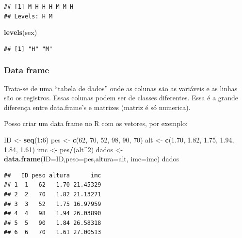 \documentclass[
]{book}
\newenvironment{Shaded}{\begin{snugshade}}{\end{snugshade}}
\newcommand{\DataTypeTok}[1]{\textcolor[rgb]{0.13,0.29,0.53}{#1}}
\newcommand{\DecValTok}[1]{\textcolor[rgb]{0.00,0.00,0.81}{#1}}
\newcommand{\FloatTok}[1]{\textcolor[rgb]{0.00,0.00,0.81}{#1}}
\newcommand{\KeywordTok}[1]{\textcolor[rgb]{0.13,0.29,0.53}{\textbf{#1}}}
\newcommand{\NormalTok}[1]{#1}
\newcommand{\OperatorTok}[1]{\textcolor[rgb]{0.81,0.36,0.00}{\textbf{#1}}}
\newcommand{\StringTok}[1]{\textcolor[rgb]{0.31,0.60,0.02}{#1}}
\begin{document}
\begin{verbatim}
## [1] M H H H M M H
## Levels: H M
\end{verbatim}

\begin{Shaded}
\begin{Highlighting}[]
\KeywordTok{levels}\NormalTok{(sex)}
\end{Highlighting}
\end{Shaded}

\begin{verbatim}
## [1] "H" "M"
\end{verbatim}

\hypertarget{data-frame}{%
\subsubsection{Data frame}\label{data-frame}}

Trata-se de uma ``tabela de dados'' onde as colunas são as variáveis e as linhas são os registros. Essas colunas podem ser de classes diferentes.
Essa é a grande diferença entre data.frame's e matrizes (matriz é só numerica).

Posso criar um data frame no R com os vetores, por exemplo:

\begin{Shaded}
\begin{Highlighting}[]
\NormalTok{ID <-}\StringTok{ }\KeywordTok{seq}\NormalTok{(}\DecValTok{1}\OperatorTok{:}\DecValTok{6}\NormalTok{)}
\NormalTok{pes <-}\StringTok{ }\KeywordTok{c}\NormalTok{(}\DecValTok{62}\NormalTok{, }\DecValTok{70}\NormalTok{, }\DecValTok{52}\NormalTok{, }\DecValTok{98}\NormalTok{, }\DecValTok{90}\NormalTok{, }\DecValTok{70}\NormalTok{)}
\NormalTok{alt <-}\StringTok{ }\KeywordTok{c}\NormalTok{(}\FloatTok{1.70}\NormalTok{, }\FloatTok{1.82}\NormalTok{, }\FloatTok{1.75}\NormalTok{, }\FloatTok{1.94}\NormalTok{, }\FloatTok{1.84}\NormalTok{, }\FloatTok{1.61}\NormalTok{)}
\NormalTok{imc <-}\StringTok{ }\NormalTok{pes}\OperatorTok{/}\NormalTok{(alt}\OperatorTok{^}\DecValTok{2}\NormalTok{)}
\NormalTok{dados <-}\StringTok{ }\KeywordTok{data.frame}\NormalTok{(}\DataTypeTok{ID=}\NormalTok{ID,}\DataTypeTok{peso=}\NormalTok{pes,}\DataTypeTok{altura=}\NormalTok{alt, }\DataTypeTok{imc=}\NormalTok{imc)}
\NormalTok{dados}
\end{Highlighting}
\end{Shaded}

\begin{verbatim}
##   ID peso altura      imc
## 1  1   62   1.70 21.45329
## 2  2   70   1.82 21.13271
## 3  3   52   1.75 16.97959
## 4  4   98   1.94 26.03890
## 5  5   90   1.84 26.58318
## 6  6   70   1.61 27.00513
\end{verbatim}
\end{document}

